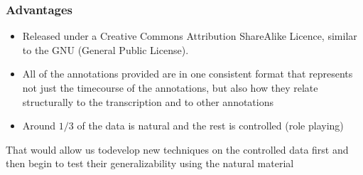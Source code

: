 
\begin{frame}

  \frametitle{Advantages}
  \begin{itemize}
    \item Released under a Creative Commons Attribution ShareAlike Licence, similar to the GNU (General Public License).
    \item All of the annotations provided are in one consistent format that represents not just the timecourse of the annotations, but also how they    relate structurally to the transcription and to other annotations
    \item Around $1/3$ of the data is natural and the rest is controlled (role playing)
  \end{itemize}
That would allow us todevelop new techniques on the controlled data first and then begin to test their generalizability using the natural material
\end{frame}



